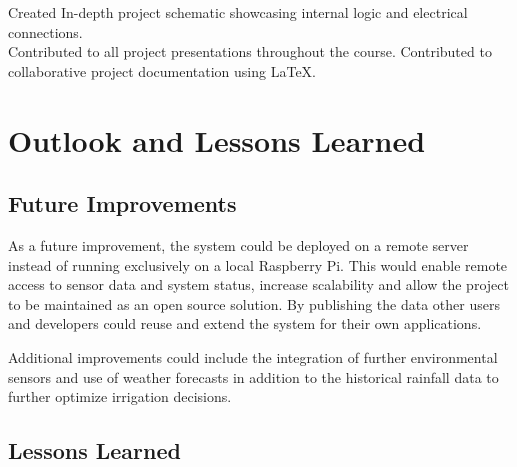 \documentclass[paper=a4,fontsize=12pt,ngerman]{scrartcl}
\begin{document}
Created In-depth project schematic showcasing internal logic and electrical connections.\\
Contributed to all project presentations throughout the course. Contributed to collaborative project documentation using \LaTeX.

\section{Outlook and Lessons Learned}

\subsection{Future Improvements}

As a future improvement, the system could be deployed on a remote server instead of running exclusively on a local Raspberry Pi. This would enable remote access to sensor data and system status, increase scalability and allow the project to be maintained as an open source solution. By publishing the data other users and developers could reuse and extend the system for their own applications.

Additional improvements could include the integration of further environmental sensors and use of weather forecasts in addition to the historical rainfall data to further optimize irrigation decisions.

\subsection{Lessons Learned}
\end{document}
